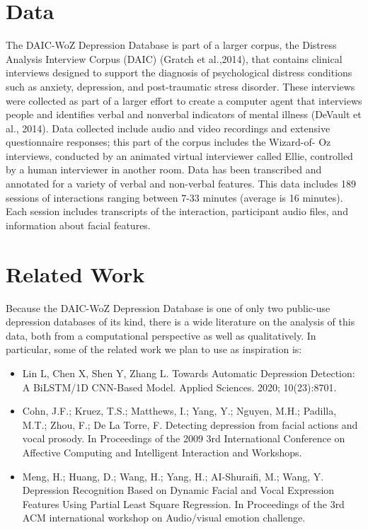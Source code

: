 \section{Data}

The DAIC-WoZ Depression Database is part of a larger corpus, the Distress Analysis Interview Corpus (DAIC) (Gratch et al.,2014), that contains clinical interviews designed to support the diagnosis of psychological distress conditions such as anxiety, depression, and post-traumatic stress disorder. These interviews were collected as part of a larger effort to create a computer agent that interviews people and identifies verbal and nonverbal indicators of mental illness (DeVault et al., 2014). Data collected include audio and video recordings and extensive questionnaire responses; this part of the corpus includes the Wizard-of- Oz interviews, conducted by an animated virtual interviewer called Ellie, controlled by a human interviewer in another room. Data has been transcribed and annotated for a variety of verbal and non-verbal features. This data includes 189 sessions of interactions ranging between 7-33 minutes (average is 16 minutes). Each session includes transcripts of the interaction, participant audio files, and information about facial features.



\section{Related Work}

Because the DAIC-WoZ Depression Database is one of only two public-use depression databases of its kind, there is a wide literature on the analysis of this data, both from a computational perspective as well as qualitatively. In particular, some of the related work we plan to use as inspiration is:

\begin{itemize}
    \item Lin L, Chen X, Shen Y, Zhang L. Towards Automatic Depression Detection: A BiLSTM/1D CNN-Based Model. Applied Sciences. 2020; 10(23):8701. 
    \item Cohn, J.F.; Kruez, T.S.; Matthews, I.; Yang, Y.; Nguyen, M.H.; Padilla, M.T.; Zhou, F.; De La Torre, F. Detecting depression from facial actions and vocal prosody. In Proceedings of the 2009 3rd International Conference on Affective Computing and Intelligent Interaction and Workshops.
    \item Meng, H.; Huang, D.; Wang, H.; Yang, H.; AI-Shuraifi, M.; Wang, Y. Depression Recognition Based on Dynamic Facial and Vocal Expression Features Using Partial Least Square Regression. In Proceedings of the 3rd ACM international workshop on Audio/visual emotion challenge.
\end{itemize}





